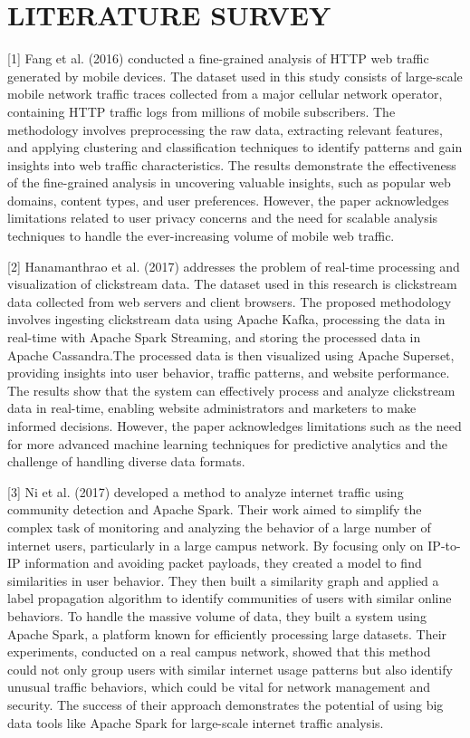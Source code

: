 \documentclass[conference]{IEEEtran}
\begin{document}
\section{LITERATURE SURVEY}
[1] Fang et al. (2016) conducted a fine-grained analysis of HTTP web traffic generated by mobile
devices. The dataset used in this study consists of large-scale mobile network traffic traces
collected from a major cellular network operator, containing HTTP traffic logs from millions of
mobile subscribers. The methodology involves preprocessing the raw data, extracting relevant
features, and applying clustering and classification techniques to identify patterns and gain
insights into web traffic characteristics. The results demonstrate the effectiveness of the
fine-grained analysis in uncovering valuable insights, such as popular web domains, content
types, and user preferences. However, the paper acknowledges limitations related to user privacy
concerns and the need for scalable analysis techniques to handle the ever-increasing volume of
mobile web traffic.

[2] Hanamanthrao et al. (2017) addresses the problem of real-time processing and visualization of
clickstream data. The dataset used in this research is clickstream data collected from web servers
and client browsers. The proposed methodology involves ingesting clickstream data using
Apache Kafka, processing the data in real-time with Apache Spark Streaming, and storing the
processed data in Apache Cassandra.The processed data is then visualized using Apache
Superset, providing insights into user behavior, traffic patterns, and website performance. The
results show that the system can effectively process and analyze clickstream data in real-time,
enabling website administrators and marketers to make informed decisions. However, the paper
acknowledges limitations such as the need for more advanced machine learning techniques for
predictive analytics and the challenge of handling diverse data formats.

[3] Ni et al. (2017) developed a method to analyze internet traffic using community detection and
Apache Spark. Their work aimed to simplify the complex task of monitoring and analyzing the
behavior of a large number of internet users, particularly in a large campus network. By focusing
only on IP-to-IP information and avoiding packet payloads, they created a model to find
similarities in user behavior. They then built a similarity graph and applied a label propagation
algorithm to identify communities of users with similar online behaviors. To handle the massive
volume of data, they built a system using Apache Spark, a platform known for efficiently
processing large datasets. Their experiments, conducted on a real campus network, showed that
this method could not only group users with similar internet usage patterns but also identify
unusual traffic behaviors, which could be vital for network management and security. The
success of their approach demonstrates the potential of using big data tools like Apache Spark
for large-scale internet traffic analysis.
\end{document}
